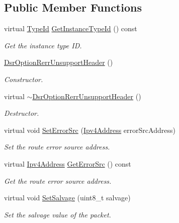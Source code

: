 \subsection*{Public Member Functions}
\begin{DoxyCompactItemize}
\item 
virtual \hyperlink{classns3_1_1TypeId}{Type\+Id} \hyperlink{classns3_1_1dsr_1_1DsrOptionRerrUnsupportHeader_ae0d3ab9f406e8b2673c6bd9e9eb5f948}{Get\+Instance\+Type\+Id} () const 
\begin{DoxyCompactList}\small\item\em Get the instance type ID. \end{DoxyCompactList}\item 
\hyperlink{classns3_1_1dsr_1_1DsrOptionRerrUnsupportHeader_ae8a312820149cdd07847a9c96ba755f5}{Dsr\+Option\+Rerr\+Unsupport\+Header} ()
\begin{DoxyCompactList}\small\item\em Constructor. \end{DoxyCompactList}\item 
virtual \hyperlink{classns3_1_1dsr_1_1DsrOptionRerrUnsupportHeader_a18b395d3f265430ae8740d8955cc614a}{$\sim$\+Dsr\+Option\+Rerr\+Unsupport\+Header} ()
\begin{DoxyCompactList}\small\item\em Destructor. \end{DoxyCompactList}\item 
virtual void \hyperlink{classns3_1_1dsr_1_1DsrOptionRerrUnsupportHeader_aa490b49720142ba4328a02ce7bc2ce78}{Set\+Error\+Src} (\hyperlink{classns3_1_1Ipv4Address}{Ipv4\+Address} error\+Src\+Address)
\begin{DoxyCompactList}\small\item\em Set the route error source address. \end{DoxyCompactList}\item 
virtual \hyperlink{classns3_1_1Ipv4Address}{Ipv4\+Address} \hyperlink{classns3_1_1dsr_1_1DsrOptionRerrUnsupportHeader_a240f9b0625c4a642d53b0d9e8074aa43}{Get\+Error\+Src} () const 
\begin{DoxyCompactList}\small\item\em Get the route error source address. \end{DoxyCompactList}\item 
virtual void \hyperlink{classns3_1_1dsr_1_1DsrOptionRerrUnsupportHeader_a35ecb8d41cc837e698bb3b10e4ae125f}{Set\+Salvage} (uint8\+\_\+t salvage)
\begin{DoxyCompactList}\small\item\em Set the salvage value of the packet. \end{DoxyCompactList}\item 

\end{DoxyCompactItemize}
